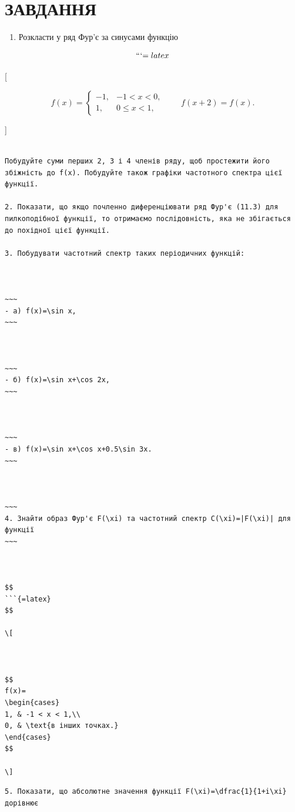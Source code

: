 \documentclass[
  ukrainian,
]{article}
\providecommand{\tightlist}{%
  \setlength{\itemsep}{0pt}\setlength{\parskip}{0pt}}
\begin{document}
\section{ЗАВДАННЯ}\label{ux437ux430ux432ux434ux430ux43dux43dux44f-9}

\begin{enumerate}
\def\labelenumi{\arabic{enumi}.}
\tightlist
\item
  Розкласти у ряд Фур'є за синусами функцію
\end{enumerate}

\[
```{=latex}
\]

{[}

\[
f(x)=
\begin{cases}
-1, & -1 < x < 0,\\
1, & 0 \le x < 1,
\end{cases}
\qquad
f(x+2)=f(x).
\]

{]}

\begin{verbatim}

Побудуйте суми перших 2, 3 і 4 членів ряду, щоб простежити його збіжність до f(x). Побудуйте також графіки частотного спектра цієї функції.

2. Показати, що якщо почленно диференціювати ряд Фур'є (11.3) для пилкоподібної функції, то отримаємо послідовність, яка не збігається до похідної цієї функції.

3. Побудувати частотний спектр таких періодичних функцій:



~~~
- a) f(x)=\sin x,
~~~



~~~
- б) f(x)=\sin x+\cos 2x,
~~~



~~~
- в) f(x)=\sin x+\cos x+0.5\sin 3x.
~~~



~~~
4. Знайти образ Фур'є F(\xi) та частотний спектр C(\xi)=|F(\xi)| для функції
~~~



$$
```{=latex}
$$

\[



$$
f(x)=
\begin{cases}
1, & -1 < x < 1,\\
0, & \text{в інших точках.}
\end{cases}
$$

\]
\end{verbatim}

\begin{verbatim}
5. Показати, що абсолютне значення функції F(\xi)=\dfrac{1}{1+i\xi} дорівнює
\end{verbatim}
\end{document}
